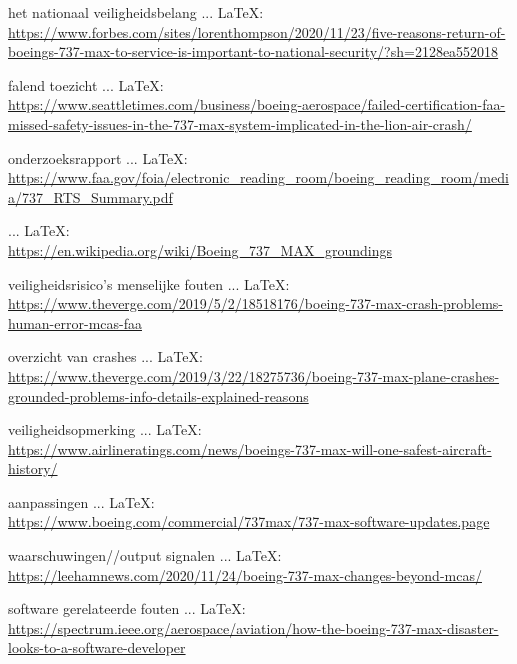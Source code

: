 \begin{thebibliography}{99}
{{{{{{{{							het nationaal veiligheidsbelang
							 ... \LaTeX:\\ \url{https://www.forbes.com/sites/lorenthompson/2020/11/23/five-reasons-return-of-boeings-737-max-to-service-is-important-to-national-security/?sh=2128ea552018}
							
							falend toezicht
							 ... \LaTeX:\\ \url{https://www.seattletimes.com/business/boeing-aerospace/failed-certification-faa-missed-safety-issues-in-the-737-max-system-implicated-in-the-lion-air-crash/}
							
							onderzoeksrapport
							 ... \LaTeX:\\ \url{https://www.faa.gov/foia/electronic_reading_room/boeing_reading_room/media/737_RTS_Summary.pdf}
							
							 ... \LaTeX:\\ \url{https://en.wikipedia.org/wiki/Boeing_737_MAX_groundings}
							
							veiligheidsrisico's
							menselijke fouten
							 ... \LaTeX:\\ \url{https://www.theverge.com/2019/5/2/18518176/boeing-737-max-crash-problems-human-error-mcas-faa}
							
							overzicht van crashes
							 ... \LaTeX:\\ \url{https://www.theverge.com/2019/3/22/18275736/boeing-737-max-plane-crashes-grounded-problems-info-details-explained-reasons}
							
							veiligheidsopmerking
							 ... \LaTeX:\\ \url{https://www.airlineratings.com/news/boeings-737-max-will-one-safest-aircraft-history/}
							
							aanpassingen
							 ... \LaTeX:\\ \url{https://www.boeing.com/commercial/737max/737-max-software-updates.page}
							
							waarschuwingen//output signalen
							 ... \LaTeX:\\ \url{https://leehamnews.com/2020/11/24/boeing-737-max-changes-beyond-mcas/}
							
							software gerelateerde fouten
							 ... \LaTeX:\\ \url{https://spectrum.ieee.org/aerospace/aviation/how-the-boeing-737-max-disaster-looks-to-a-software-developer}
							
}}}}}}}}
\end{thebibliography}
